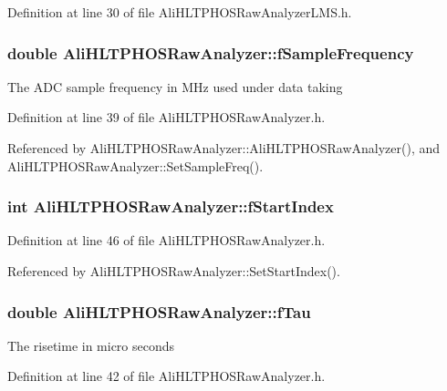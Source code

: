 Definition at line 30 of file Ali\-HLTPHOSRaw\-Analyzer\-LMS.h.
\subsubsection{\setlength{\rightskip}{0pt plus 5cm}double {\bf Ali\-HLTPHOSRaw\-Analyzer::f\-Sample\-Frequency}\hspace{0.3cm}{\tt  [protected, inherited]}}\label{classAliHLTPHOSRawAnalyzer_AliHLTPHOSRawAnalyzerPeakFinderp1}


The ADC sample frequency in MHz used under data taking 

Definition at line 39 of file Ali\-HLTPHOSRaw\-Analyzer.h.

Referenced by Ali\-HLTPHOSRaw\-Analyzer::Ali\-HLTPHOSRaw\-Analyzer(), and Ali\-HLTPHOSRaw\-Analyzer::Set\-Sample\-Freq().
\subsubsection{\setlength{\rightskip}{0pt plus 5cm}int {\bf Ali\-HLTPHOSRaw\-Analyzer::f\-Start\-Index}\hspace{0.3cm}{\tt  [protected, inherited]}}\label{classAliHLTPHOSRawAnalyzer_AliHLTPHOSRawAnalyzerPeakFinderp7}




Definition at line 46 of file Ali\-HLTPHOSRaw\-Analyzer.h.

Referenced by Ali\-HLTPHOSRaw\-Analyzer::Set\-Start\-Index().
\subsubsection{\setlength{\rightskip}{0pt plus 5cm}double {\bf Ali\-HLTPHOSRaw\-Analyzer::f\-Tau}\hspace{0.3cm}{\tt  [protected, inherited]}}\label{classAliHLTPHOSRawAnalyzer_AliHLTPHOSRawAnalyzerPeakFinderp4}


The risetime in micro seconds 

Definition at line 42 of file Ali\-HLTPHOSRaw\-Analyzer.h.
